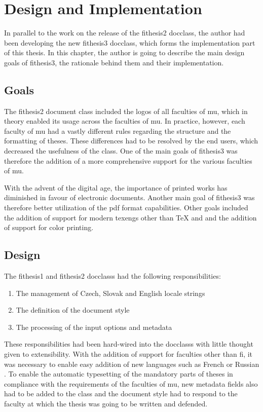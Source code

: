 \documentclass[12pt,twoside,cover,color,table]%
  {fithesis3/fithesis3/fithesis3} %
\begin{document}
  \chapter{Design and Implementation}
  In parallel to the work on the release of the \textsf{fithesis2}
  \gls{docclass}, the author had been developing the new
  \textsf{fithesis3} \gls{docclass}, which forms the implementation
  part of this thesis. In this chapter, the author is going to
  describe the main design goals of \textsf{fithesis3}, the
  rationale behind them and their implementation.

  \section{Goals}
  The \textsf{fithesis2} document class included the logos of all
  faculties of \gls{mu}, which in theory enabled its usage across
  the faculties of \gls{mu}. In practice, however, each faculty of
  \gls{mu} had a vastly different rules regarding the structure and
  the formatting of theses. These differences had to be resolved by
  the end users, which decreased the usefulness of the class. One
  of the main goals of \textsf{fithesis3} was therefore the
  addition of a more comprehensive support for the various
  faculties of \gls{mu}.

  With the advent of the digital age, the importance of printed
  works has diminished in favour of electronic documents. Another
  main goal of \textsf{fithesis3} was therefore better utilization
  of the \gls{pdf} format capabilities. Other goals included the
  addition of support for modern \glspl{texeng} other than \TeX{}
  and  and the addition of support for color
  printing.

  \section{Design}
  The \textsf{fithesis1} and \textsf{fithesis2} \glspl{docclass}
  had the following responsibilities: \begin{enumerate}
    \item The management of Czech, Slovak and English locale
      strings
    \item The definition of the document style
    \item The processing of the input options and metadata
  \end{enumerate} These responsibilities had been hard-wired into
  the \glspl{docclass} with little thought given to extensibility.  
  With the addition of support for faculties other than \gls{fi},
  it was necessary to enable easy addition of new languages such as
  French \cite{Zeman14} or Russian \cite{Kupcevic14}. To enable the
  automatic typesetting of the mandatory parts of theses in
  compliance with the requirements of the faculties of \gls{mu},
  new metadata fields also had to be added to the class and the
  document style had to respond to the faculty at which the thesis
  was going to be written and defended.
  
\end{document}
